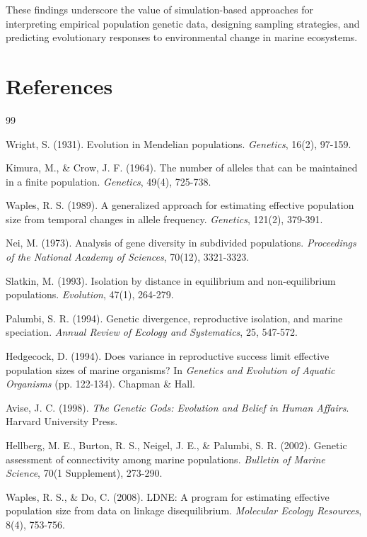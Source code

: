 \documentclass[11pt,a4paper]{article}
\begin{document}
These findings underscore the value of simulation-based approaches for interpreting empirical population
genetic data, designing sampling strategies, and predicting evolutionary responses to environmental change
in marine ecosystems.

\section*{References}

\begin{thebibliography}{99}

 Wright, S. (1931). Evolution in Mendelian populations. \textit{Genetics}, 16(2), 97-159.

 Kimura, M., \& Crow, J. F. (1964). The number of alleles that can be maintained in a finite population. \textit{Genetics}, 49(4), 725-738.

 Waples, R. S. (1989). A generalized approach for estimating effective population size from temporal changes in allele frequency. \textit{Genetics}, 121(2), 379-391.

 Nei, M. (1973). Analysis of gene diversity in subdivided populations. \textit{Proceedings of the National Academy of Sciences}, 70(12), 3321-3323.

 Slatkin, M. (1993). Isolation by distance in equilibrium and non-equilibrium populations. \textit{Evolution}, 47(1), 264-279.

 Palumbi, S. R. (1994). Genetic divergence, reproductive isolation, and marine speciation. \textit{Annual Review of Ecology and Systematics}, 25, 547-572.

 Hedgecock, D. (1994). Does variance in reproductive success limit effective population sizes of marine organisms? In \textit{Genetics and Evolution of Aquatic Organisms} (pp. 122-134). Chapman \& Hall.

 Avise, J. C. (1998). \textit{The Genetic Gods: Evolution and Belief in Human Affairs}. Harvard University Press.

 Hellberg, M. E., Burton, R. S., Neigel, J. E., \& Palumbi, S. R. (2002). Genetic assessment of connectivity among marine populations. \textit{Bulletin of Marine Science}, 70(1 Supplement), 273-290.

 Waples, R. S., \& Do, C. (2008). LDNE: A program for estimating effective population size from data on linkage disequilibrium. \textit{Molecular Ecology Resources}, 8(4), 753-756.


\end{thebibliography}
\end{document}
